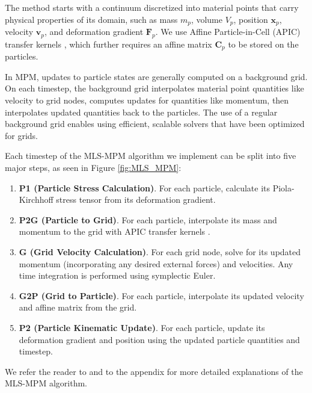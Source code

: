     The method starts with a continuum discretized into material points that carry physical properties of its domain, such as mass $m_p$, volume $V_p$, position $\mathbf{x}_p$, velocity $\mathbf{v}_p$, and deformation gradient $\mathbf{F}_p$.
    We use Affine Particle-in-Cell (APIC) transfer kernels \citep{jiang2017angular}, which further requires an affine matrix $\mathbf{C}_p$ to be stored on the particles.
    
    In MPM, updates to particle states are generally computed on a background grid.
    On each timestep, the background grid interpolates material point quantities like velocity to grid nodes, computes updates for quantities like momentum, then interpolates updated quantities back to the particles.
    The use of a regular background grid enables using efficient, scalable solvers that have been optimized for grids.
    
    Each timestep of the {MLS-MPM} algorithm we implement can be split into five major steps, as seen in Figure \ref{fig:MLS_MPM}:
        \begin{enumerate}
          \item \textbf{P1 (Particle Stress Calculation)}. For each particle, calculate its Piola-Kirchhoff stress tensor from its deformation gradient.
          \item \textbf{P2G (Particle to Grid)}. For each particle, interpolate its mass and momentum to the grid with APIC transfer kernels \citep{2015-APIC, jiang2017angular}.
          \item \textbf{G (Grid Velocity Calculation)}. For each grid node, solve for its updated momentum (incorporating any desired external forces) and velocities. %
          Any time integration is performed using symplectic Euler.
          \item \textbf{G2P (Grid to Particle)}. For each particle, interpolate its updated velocity and affine matrix from the grid.
          \item \textbf{P2 (Particle Kinematic Update)}. For each particle, update its deformation gradient and position using the updated particle quantities and timestep.
        \end{enumerate}
    We refer the reader to \citet{2018-MLSMPM} and to the appendix for more detailed explanations of the {MLS-MPM} algorithm.

